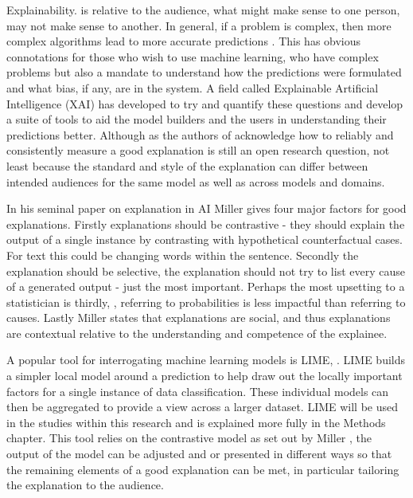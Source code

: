 Explainability. is relative to the audience, what might make sense to one person, may not make sense to another. In general, if a problem is complex, then more complex algorithms lead to more accurate predictions \parencite{arrieta2020explainable}. This has obvious connotations for those who wish to use machine learning, who have complex problems but also a mandate to understand how the predictions were formulated and what bias, if any, are in the system. A field called Explainable Artificial Intelligence (XAI)  \parencite{gunning2019xai} has developed to try and quantify these questions and develop a suite of tools to aid the model builders and the users in understanding their predictions better.  Although as the authors of \parencite{gunning2019xai}  acknowledge how to reliably and consistently measure a good explanation is still an open research question, not least because the standard and style of the explanation can differ between intended audiences for the same model as well as across models and domains.

In his seminal paper on explanation in AI \parencite{miller2019explanation} Miller gives four major factors for good explanations. Firstly explanations should be contrastive - they should explain the output of a single instance by contrasting with hypothetical counterfactual cases. For text this could be changing words within the sentence.  Secondly the explanation should be selective, the explanation should not try to list every cause of a generated output - just the most important. Perhaps the most upsetting to a statistician is thirdly,  ,  referring to probabilities is less impactful than referring to causes. Lastly Miller states that explanations are social, and thus explanations are contextual relative to the understanding and competence of the explainee. 

A popular tool  for interrogating machine learning models is LIME, \parencite{ribeiro2016should}. LIME  builds a simpler local model around a prediction to help draw out the locally important factors for a single instance of data classification. These individual models can then be aggregated to provide a view across a larger dataset.  LIME will be used in the studies within this research and is explained more fully in the Methods chapter. This tool relies on the contrastive model as set out by Miller \parencite{miller2019explanation}, the output of the model can be adjusted and or presented in different ways so that the remaining elements of a good explanation can be met, in particular tailoring the explanation to the audience.

